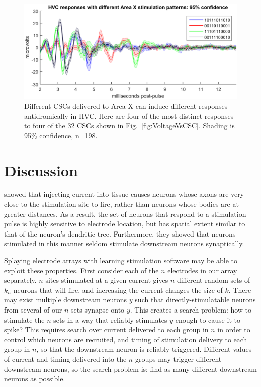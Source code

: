 \documentclass[10pt,letterpaper]{article}
\newcommand\fig[1]{Fig.~\ref{#1}}
\begin{document}
\begin{figure}
  \includegraphics[width=\textwidth]{HVCresponseVsCSC}
  \caption{Different CSCs delivered to Area X can induce different responses antidromically in HVC.  Here are four of the most distinct responses to four of the 32 CSCs shown in \fig{fig:VoltageVsCSC}.  Shading is 95\% confidence, n=198.}
  \label{fig:HVCresponseVsCSC}
\end{figure}


\section{Discussion}

\cite{Histed2009stimulation} showed that injecting current into tissue causes neurons whose axons are very close to the stimulation site to fire, rather than neurons whose bodies are at greater distances.  As a result, the set of neurons that respond to a stimulation pulse is highly sensitive to electrode location, but has spatial extent similar to that of the neuron's dendritic tree.  Furthermore, they showed that neurons stimulated in this manner seldom stimulate downstream neurons synaptically.

Splaying electrode arrays with learning stimulation software may be able to exploit these properties.  First consider each of the $n$ electrodes in our array separately.  $n$ sites stimulated at a given current gives $n$ different random sets of $k_n$ neurons that will fire, and increasing the current changes the size of $k$.  There may exist multiple downstream neurons $y$ such that directly-stimulatable neurons from several of our $n$ sets synapse onto $y$.  This creates a search problem: how to stimulate the $n$ sets in a way that reliably stimulates $y$ enough to cause it to spike?  This requires search over current delivered to each group in $n$ in order to control which neurons are recruited, and timing of stimulation delivery to each group in $n$, so that the downstream neuron is reliably triggered.  Different values of current and timing delivered into the $n$ groups may trigger different downstream neurons, so the search problem is: find as many different downstream neurons as possible.
\end{document}
